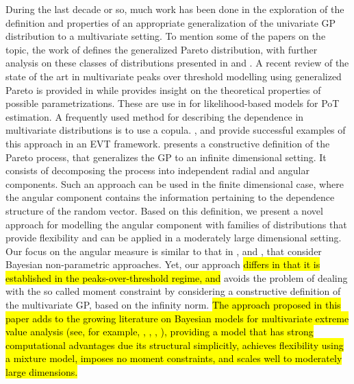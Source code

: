 \documentclass[iicol,sn-basic]{sn-jnl}
\theoremstyle{thmstyleone}
\begin{document}
During the last decade or so, much work has been done in the exploration of the definition and properties
of an appropriate generalization of the univariate GP distribution to a multivariate setting.  To mention
some of the papers on the topic, the work of \citep{rootzen2006} defines the generalized Pareto distribution,
with further analysis on these classes of distributions presented in \cite{falk2008} and \cite{michel2008}.  
A recent review of the state of the art in multivariate peaks over threshold modelling using generalized 
Pareto is provided in \cite{rootzen2018} while \cite{RoSeWa2018a} provides insight on the theoretical 
properties of possible parametrizations. These are use in \cite{KiRoSeWa2019} for likelihood-based models 
for PoT estimation. A frequently used method for describing the dependence in multivariate distributions is
to use a copula. \cite{renard2007}, and \cite{falk2019} provide successful examples of this approach in an 
EVT framework. \cite{ferreira2014} presents a constructive definition of the Pareto process, that generalizes
the GP to an infinite dimensional setting. It consists of decomposing the process into independent radial and 
angular components. Such an approach can be used in the finite dimensional case, where the angular component 
contains the information pertaining to the dependence structure of the random vector. Based on this definition, 
we present a novel approach for modelling  the angular component with families of distributions that provide 
flexibility and can be applied in a moderately large dimensional setting.  Our focus on the angular measure is 
similar to that in \hl{\mbox{\cite{boldi2007}}}, \cite{SaNa2014} and \cite{HaCaCh2017}, that consider Bayesian 
non-parametric approaches. Yet, our approach \hl{differs in that it is established in the peaks-over-threshold 
regime, and }avoids the problem of dealing with the so called moment constraint by considering a constructive 
definition of the multivariate GP, based on the infinity norm. \hl{The approach proposed in this paper adds to 
the growing literature on Bayesian models for multivariate extreme value analysis (see, for example, 
\mbox{\cite{boldi2007}}, \mbox{\cite{guillotte2011}}, \mbox{\cite{SaNa2014}}, \mbox{\cite{hanson2017}}), providing a model that has strong computational advantages due its structural simplicitly, achieves flexibility using a mixture model, imposes no moment constraints, and scales well to moderately large dimensions.}
\end{document}
